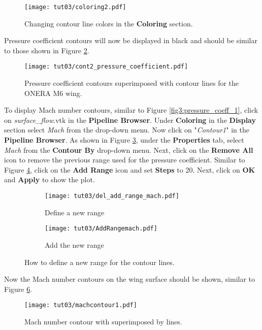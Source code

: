 \begin{figure}[htbp]
    \centering
    \texttt{[image: tut03/coloring2.pdf]}
    \caption{Changing contour line colors in the \textbf{Coloring} section.}
    \label{fig3:colorby2}
\end{figure}
Pressure coefficient contours will now be displayed in black and should be similar to those shown in Figure \ref{fig3:pressure_contour_lines}.
\begin{figure}[htbp]
    \centering
    \texttt{[image: tut03/cont2\_pressure\_coefficient.pdf]}
    \caption{Pressure coefficient contours superimposed with contour lines for the ONERA M6 wing.}
    \label{fig3:pressure_contour_lines}
\end{figure}

To display Mach number contours, similar to Figure \ref{fig3:pressure_coeff_1}, click on \textit{surface\_flow}.vtk in the \textbf{Pipeline Browser}. Under \textbf{Coloring} in the \textbf{Display} section select \textit{Mach} from the drop-down menu. Now click on "\textit{Contour1}" in the \textbf{Pipeline Browser}. As shown in Figure \ref{fig3:contourby2 a}, under the \textbf{Properties} tab, select \textit{Mach} from the \textbf{Contour By} drop-down menu. Next, click on the \textbf{Remove All} icon to remove the previous range used for the pressure coefficient. Similar to Figure \ref{fig3:contourby2 b}, click on the \textbf{Add Range} icon and set \textbf{Steps} to 20. Next, click on \textbf{OK} and \textbf{Apply} to show the plot.
\begin{figure}[htbp]
    \centering
     \begin{subfigure}[b]{.4\textwidth}
         \centering
         \texttt{[image: tut03/del\_add\_range\_mach.pdf]}
         \caption{Define a new range}
         \label{fig3:contourby2 a}
     \end{subfigure}
     \hfill
     \begin{subfigure}[b]{.4\textwidth}
         \centering
         \texttt{[image: tut03/AddRangemach.pdf]}
         \caption{Add the new range}
         \label{fig3:contourby2 b}
     \end{subfigure}     
    \caption{How to define a new range for the contour lines.}
    \label{fig3:contourby2}
\end{figure}
Now the Mach number contours on the wing surface should be shown, similar to Figure \ref{fig3:mach_contour}.
\begin{figure}[htbp]
    \centering
    \texttt{[image: tut03/machcontour1.pdf]}
    \caption{Mach number contour with superimposed by lines.}
    \label{fig3:mach_contour}
\end{figure}
